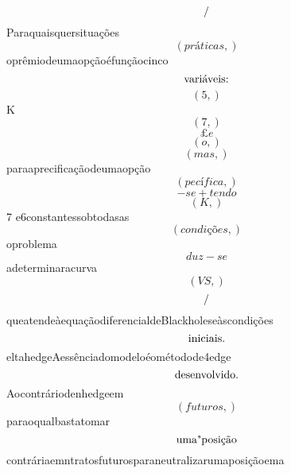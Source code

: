 \documentclass{article}
\begin{document}
\begin{equation}
$/$
\end{equation}Paraquaisquersituações\begin{equation}
\left( práticas,\right)
\end{equation}oprêmiodeumaopçãoéfunçãocinco\begin{equation}
$variáveis:$
\end{equation}\begin{equation}
\left( 5,\right)
\end{equation}K\begin{equation}
\left( 7,\right)
\end{equation}\begin{equation}
£e
\end{equation}\begin{equation}
\left( o,\right)
\end{equation}\begin{equation}
\left( mas,\right)
\end{equation}paraaprecificaçãodeumaopção\begin{equation}
\left( pecífica,\right)
\end{equation}\begin{equation}
- se + tendo
\end{equation}\begin{equation}
\left( K,\right)
\end{equation}7 e6constantessobtodasas\begin{equation}
\left( condições,\right)
\end{equation}oproblema\begin{equation}
duz - se
\end{equation}adeterminaracurva\begin{equation}
\left( VS,\right)
\end{equation}\begin{equation}
$/$
\end{equation}queatendeàequaçãodiferencialdeBlackholeseàscondições\begin{equation}
$iniciais.$
\end{equation}eltahedgeAessênciadomodeloéométodode4edge\begin{equation}
$desenvolvido.$
\end{equation}Aocontráriodenhedgeem\begin{equation}
\left( futuros,\right)
\end{equation}paraoqualbastatomar\begin{equation}
$uma"posição$
\end{equation}contráriaemntratosfuturosparaneutralizarumaposiçãoema\begin{equation}

\end{equation}
\end{document}

